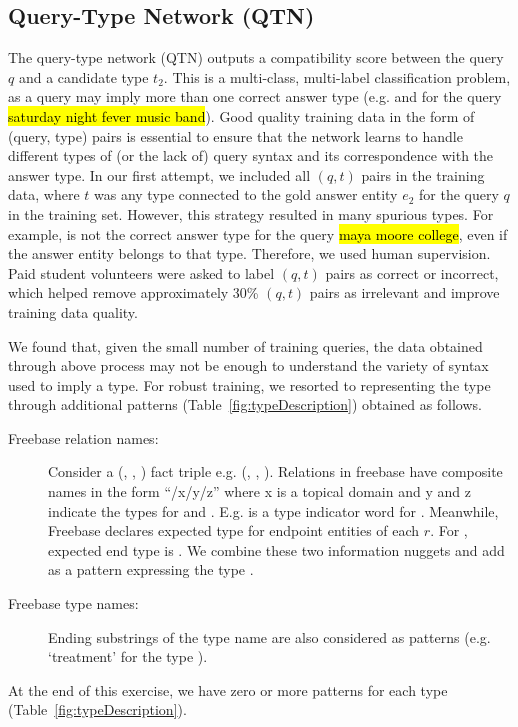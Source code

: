 \documentclass{svjour3}
\DeclareRobustCommand{\query}[1]{{\sethlcolor{qcolor}\sffamily\hl{#1}}}
\begin{document}
\subsection{Query-Type Network (QTN)}
\label{sec:qtn}

The query-type network (QTN) outputs a compatibility score between the query $q$ and a candidate type $t_2$.  This is a multi-class,
multi-label classification problem, as a query may imply more than one correct answer type (e.g.  and
 for the query \query{saturday night fever music band}).  Good quality training data in the form of (query, type) pairs is essential to ensure that the network learns to handle different types of (or the lack of) query syntax and its correspondence with the answer type.  In our first attempt, we included all $(q, t)$ pairs in the training data, where $t$ was any type connected to the gold answer entity $e_2$ for the query $q$ in the training set.  However, this strategy resulted in many spurious types.  For example,  is not the correct answer type for the query \query{maya moore college}, even if the answer entity  belongs to that type.  Therefore, we used human supervision.  Paid student volunteers were asked to label $(q, t)$ pairs as correct or incorrect, which helped remove approximately 30\% $(q, t)$ pairs as irrelevant and improve training data quality.


We found that, given the small number of training queries, the data obtained through above process may not be enough to understand the variety of syntax used to imply a type.  For robust training, we resorted to representing the type through additional patterns (Table~\ref{fig:typeDescription}) obtained as follows.
\begin{description}
\item[Freebase relation names:] Consider a (,
  , ) fact triple
  e.g. (,
  , ).  Relations in freebase have
  composite names in the form ``/x/y/z'' where x is a topical domain and 
  y and z indicate the
  types for  and . E.g.  is a
  type indicator word for .  Meanwhile, Freebase declares
  expected type for endpoint entities of each $r$. For
  , expected end type is . 
  We combine these two information
  nuggets and add  as a pattern expressing the type
  .
\item[Freebase type names:] Ending substrings of the type name are
  also considered as patterns (e.g. `treatment' for the type
  ).
\end{description}
At the end of this exercise, we have zero or more patterns for each
type (Table~\ref{fig:typeDescription}).
\end{document}
